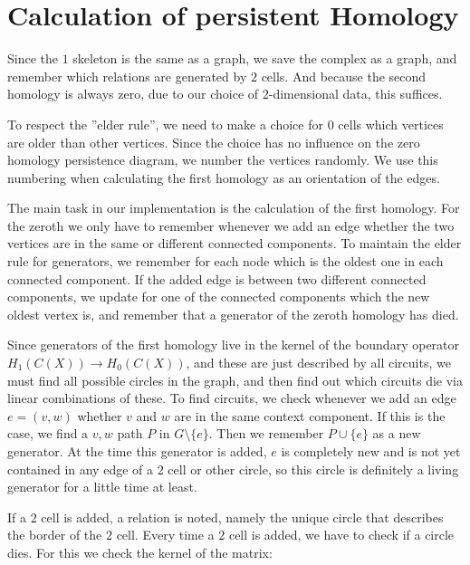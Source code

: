 \documentclass[11pt, a4paper,draft]{report}
\begin{document}
    \section{Calculation of persistent Homology}\label{sec:calculation-of-persistent-homology}

    Since the $1$ skeleton is the same as a graph, we save the complex as a graph, and remember which relations are generated by $2$ cells.
    And because the second homology is always zero, due to our choice of $2$-dimensional data, this suffices.

    To respect the ''elder rule'', we need to make a choice for $0$ cells which vertices are older than other vertices.
    Since the choice has no influence on the zero homology persistence diagram, we number the vertices randomly.
    We use this numbering when calculating the first homology as an orientation of the edges.

    The main task in our implementation is the calculation of the first homology.
    For the zeroth we only have to remember whenever we add an edge whether the two vertices are in the same or different connected components.
    To maintain the elder rule for generators, we remember for each node which is the oldest one in each connected component.
    If the added edge is between two different connected components, we update for one of the connected components which the new oldest vertex is, and remember that a generator of the zeroth homology has died.

    Since generators of the first homology live in the kernel of the boundary operator $H_1(C(X))\rightarrow H_0(C(X))$, and these are just described by all circuits, we must find all possible circles in the graph, and then find out which circuits die via linear combinations of these.
    To find circuits, we check whenever we add an edge $e=(v,w)$ whether $v$ and $w$ are in the same context component.
    If this is the case, we find a $v,w$ path $P$ in $G\setminus \{e\}$.
    Then we remember $P\cup \{e\}$ as a new generator.
    At the time this generator is added, $e$ is completely new and is not yet contained in any edge of a $2$ cell or other circle, so this circle is definitely a living generator for a little time at least.

    If a $2$ cell is added, a relation is noted, namely the unique circle that describes the border of the $2$ cell.
    Every time a $2$ cell is added, we have to check if a circle dies.
    For this we check the kernel of the matrix:
\end{document}
